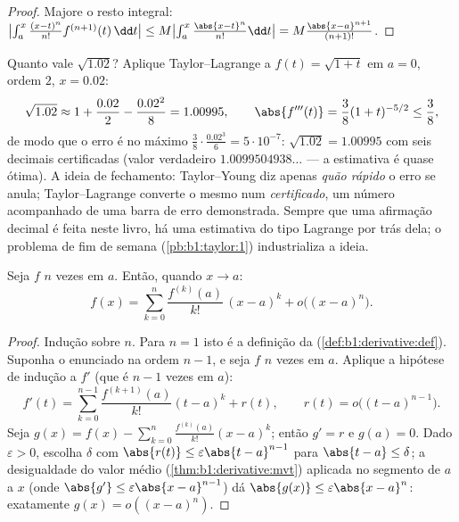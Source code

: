 \begin{proof}
Majore o resto integral: $\bigl|\int_a^x \frac{(x-t)^n}{n!}
f^{(n+1)}(t)\,\dd t\bigr| \leq M \bigl|\int_a^x
\frac{\abs{x-t}^n}{n!}\dd t\bigr| = M\frac{\abs{x-a}^{n+1}}{(n+1)!}$.
\end{proof}

\begin{example}\label{ex:b1:taylor:certified}
Quanto vale $\sqrt{1.02}$? Aplique Taylor--Lagrange a $f(t) =
\sqrt{1 + t}$ em $a = 0$,
ordem $2$, $x = 0.02$:
\[
\sqrt{1.02} \approx 1 + \frac{0.02}{2} - \frac{0.02^2}{8}
= 1.00995 ,
\qquad
\abs{f'''(t)} = \frac{3}{8}(1+t)^{-5/2} \leq \frac 38 ,
\]
de modo que o erro é no máximo $\frac38 \cdot \frac{0.02^3}{6} =
5\cdot10^{-7}$: $\sqrt{1.02} = 1.00995$ com seis decimais
certificadas (valor verdadeiro $1.0099504938\dots$ --- a estimativa é quase ótima).
A ideia de fechamento: Taylor--Young diz apenas \emph{quão rápido} o
erro se anula; Taylor--Lagrange converte o mesmo  num
\emph{certificado}, um número acompanhado de uma barra de erro
demonstrada. Sempre que uma afirmação decimal é feita neste livro, há
uma estimativa do tipo Lagrange por trás dela; o problema de fim de
semana (\cref{pb:b1:taylor:1}) industrializa a ideia.
\end{example}

\begin{theorem}\label{thm:b1:taylor:young}
Seja $f$ $n$ vezes  em $a$. Então, quando $x \to a$:
\[
f(x) = \sum_{k=0}^{n} \frac{f^{(k)}(a)}{k!}\,(x-a)^k
+ o\bigl((x-a)^n\bigr) .
\]
\end{theorem}

\begin{proof}
Indução sobre $n$. Para $n = 1$ isto é a definição da 
(\cref{def:b1:derivative:def}). Suponha o enunciado na ordem $n - 1$, e seja $f$ $n$ vezes
 em $a$. Aplique a hipótese de indução a $f'$ (que é $n-1$
vezes  em $a$):
\[
f'(t) = \sum_{k=0}^{n-1} \frac{f^{(k+1)}(a)}{k!}(t-a)^k + r(t),
\qquad r(t) = o\bigl((t-a)^{n-1}\bigr).
\]
Seja $g(x) = f(x) - \sum_{k=0}^{n} \frac{f^{(k)}(a)}{k!}(x-a)^k$; então $g' = r$ e $g(a) = 0$. Dado $\varepsilon > 0$, escolha $\delta$
com $\abs{r(t)} \leq \varepsilon\abs{t - a}^{n-1}$ para $\abs{t-a}
\leq \delta$; a desigualdade do valor médio
(\cref{thm:b1:derivative:mvt}) aplicada no segmento de $a$ a $x$ (onde $\abs{g'} \leq \varepsilon\abs{x-a}^{n-1}$) dá
$\abs{g(x)} \leq \varepsilon\abs{x - a}^n$: exatamente $g(x) =
o((x-a)^n)$.
\end{proof}

